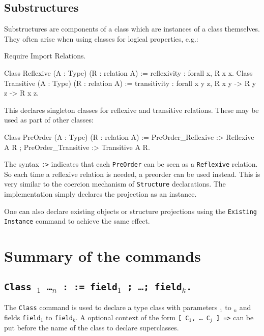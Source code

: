 \subsection{Substructures}

Substructures are components of a class which are instances of a class
themselves. They often arise when using classes for logical properties,
e.g.:

\begin{coq_eval}
Require Import Relations.
\end{coq_eval}
\begin{coq_example*}
Class Reflexive (A : Type) (R : relation A) :=
  reflexivity : forall x, R x x.
Class Transitive (A : Type) (R : relation A) :=
  transitivity : forall x y z, R x y -> R y z -> R x z.
\end{coq_example*}

This declares singleton classes for reflexive and transitive relations. 
These may be used as part of other classes:

\begin{coq_example*}
Class PreOrder (A : Type) (R : relation A) :=
  PreOrder_Reflexive :> Reflexive A R ;
  PreOrder_Transitive :> Transitive A R.
\end{coq_example*}

The syntax \texttt{:>} indicates that each \texttt{PreOrder} can be seen
as a \texttt{Reflexive} relation. So each time a reflexive relation is
needed, a preorder can be used instead. This is very similar to the
coercion mechanism of \texttt{Structure} declarations.
The implementation simply declares the projection as an instance. 

One can also declare existing objects or structure
projections using the \texttt{Existing Instance} command to achieve the 
same effect.

\section{Summary of the commands
\label{TypeClassCommands}}

\subsection{\tt Class {\ident} {\binder$_1$ \ldots \binder$_n$} 
  : \sort := field$_1$ ; \ldots ; field$_k$.}
\label{Class}

The \texttt{Class} command is used to declare a type class with
parameters {\binder$_1$} to {\binder$_n$} and fields {\tt field$_1$} to
{\tt field$_k$}. A optional context of the form {\tt [ C$_1$, \ldots
  C$_j$ ] =>} can be put before the name of the class to declare
superclasses.

